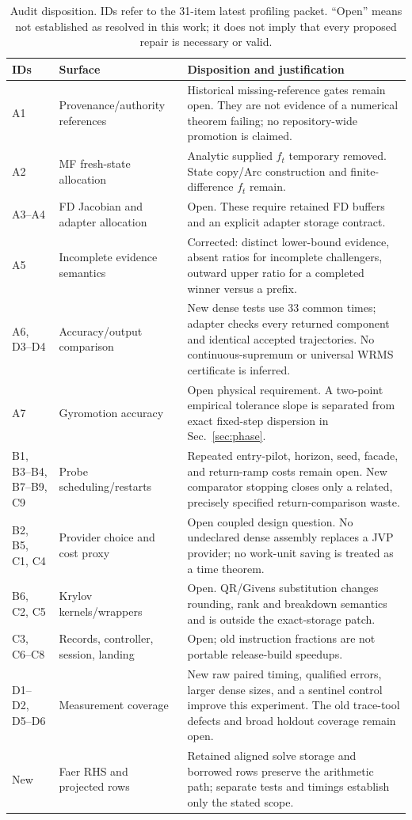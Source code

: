 \documentclass[aps,prd,reprint,amsmath,amssymb,longbibliography,nofootinbib]{revtex4-2}
\begin{document}
\begin{table}[t]
\caption{Audit disposition. IDs refer to the 31-item latest profiling packet. ``Open'' means not established as resolved in this work; it does not imply that every proposed repair is necessary or valid.}
\label{tab:audit}
\centering\small
\begin{tabular}{@{}>{\raggedright\arraybackslash}p{} >{\raggedright\arraybackslash}p{} >{\raggedright\arraybackslash}p{}@{}}
\toprule
IDs & Surface & Disposition and justification \\
\midrule
A1 & Provenance/authority references & Historical missing-reference gates remain open. They are not evidence of a numerical theorem failing; no repository-wide promotion is claimed. \\
A2 & MF fresh-state allocation & Analytic supplied $f_t$ temporary removed. State copy/Arc construction and finite-difference $f_t$ remain. \\
A3--A4 & FD Jacobian and adapter allocation & Open. These require retained FD buffers and an explicit adapter storage contract. \\
A5 & Incomplete evidence semantics & Corrected: distinct lower-bound evidence, absent ratios for incomplete challengers, outward upper ratio for a completed winner versus a prefix. \\
A6, D3--D4 & Accuracy/output comparison & New dense tests use 33 common times; adapter checks every returned component and identical accepted trajectories. No continuous-supremum or universal WRMS certificate is inferred. \\
A7 & Gyromotion accuracy & Open physical requirement. A two-point empirical tolerance slope is separated from exact fixed-step dispersion in Sec.~\ref{sec:phase}. \\
B1, B3--B4, B7--B9, C9 & Probe scheduling/restarts & Repeated entry-pilot, horizon, seed, facade, and return-ramp costs remain open. New comparator stopping closes only a related, precisely specified return-comparison waste. \\
B2, B5, C1, C4 & Provider choice and cost proxy & Open coupled design question. No undeclared dense assembly replaces a JVP provider; no work-unit saving is treated as a time theorem. \\
B6, C2, C5 & Krylov kernels/wrappers & Open. QR/Givens substitution changes rounding, rank and breakdown semantics and is outside the exact-storage patch. \\
C3, C6--C8 & Records, controller, session, landing & Open; old instruction fractions are not portable release-build speedups. \\
D1--D2, D5--D6 & Measurement coverage & New raw paired timing, qualified errors, larger dense sizes, and a sentinel control improve this experiment. The old trace-tool defects and broad holdout coverage remain open. \\
New & Faer RHS and projected rows & Retained aligned solve storage and borrowed rows preserve the arithmetic path; separate tests and timings establish only the stated scope. \\
\bottomrule
\end{tabular}
\end{table}
\end{document}
